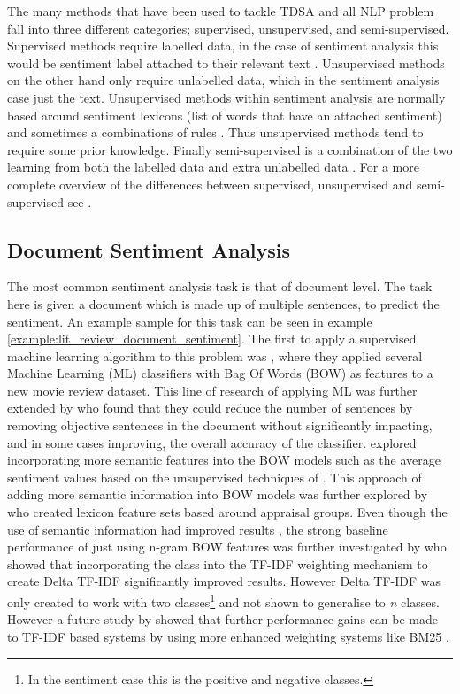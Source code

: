 The many methods that have been used to tackle TDSA and all NLP problem fall into three different categories; supervised, unsupervised, and semi-supervised. Supervised methods require labelled data, in the case of sentiment analysis this would be sentiment label attached to their relevant text \citep{pang-etal-2002-thumbs}. Unsupervised methods on the other hand only require unlabelled data, which in the sentiment analysis case just the text. Unsupervised methods within sentiment analysis are normally based around sentiment lexicons (list of words that have an attached sentiment) \citep{hu2004mining} and sometimes a combinations of rules \citep{Hutto2014VADERAP}. Thus unsupervised methods tend to require some prior knowledge. Finally semi-supervised is a combination of the two learning from both the labelled data and extra unlabelled data \citep{zhu2005semi}. For a more complete overview of the differences between supervised, unsupervised and semi-supervised see \citet{Weston2007LargeScaleSL}.

\subsection{Document Sentiment Analysis}
The most common sentiment analysis task is that of document level. The task here is given a document which is made up of multiple sentences, to predict the sentiment. An example sample for this task can be seen in example \ref{example:lit_review_document_sentiment}. The first to apply a supervised machine learning algorithm to this problem was \citet{pang-etal-2002-thumbs}, where they applied several Machine Learning (ML) classifiers with Bag Of Words (BOW) as features to a new movie review dataset. This line of research of applying ML was further extended by \citet{pang-lee-2004-sentimental} who found that they could reduce the number of sentences by removing objective sentences in the document without significantly impacting, and in some cases improving, the overall accuracy of the classifier. \citet{mullen-collier-2004-sentiment} explored incorporating more semantic features into the BOW models such as the average sentiment values based on the unsupervised techniques of \citet{turney-2002-thumbs}. This approach of adding more semantic information into BOW models was further explored by \citet{whitelaw2005using} who created lexicon feature sets based around appraisal groups. Even though the use of semantic information had improved results \citep{whitelaw2005using}, the strong baseline performance of just using n-gram BOW features was further investigated by \citet{martineau2009delta} who showed that incorporating the class into the TF-IDF weighting mechanism \citep{jones1972statistical} to create Delta TF-IDF significantly improved results. However Delta TF-IDF was only created to work with two classes\footnote{In the sentiment case this is the positive and negative classes.} and not shown to generalise to \textit{n} classes. However a future study by \citet{paltoglou-thelwall-2010-study} showed that further performance gains can be made to TF-IDF based systems by using more enhanced weighting systems like BM25 \citep{robertson1995okapi}.

